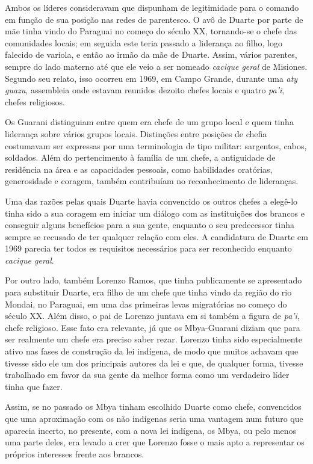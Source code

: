 Ambos os líderes consideravam que dispunham de legitimidade para o
comando em função de sua posição nas redes de parentesco. O avô de
Duarte por parte de mãe tinha vindo do Paraguai no começo do século XX,
tornando-se o chefe das comunidades locais; em seguida este teria
passado a liderança ao filho, logo falecido de varíola, e então ao irmão
da mãe de Duarte. Assim, vários parentes, sempre do lado materno até que
ele veio a ser nomeado \emph{cacique geral} de Misiones. Segundo seu
relato, isso ocorreu em 1969, em Campo Grande, durante uma \emph{aty
guazu}, assembleia onde estavam reunidos dezoito chefes locais e quatro
\emph{pa'i}, chefes religiosos.

Os Guarani distinguiam entre quem era chefe de um grupo local e quem
tinha liderança sobre vários grupos locais. Distinções entre posições de
chefia costumavam ser expressas por uma terminologia de tipo militar:
sargentos, cabos, soldados. Além do pertencimento à família de um chefe,
a antiguidade de residência na área e as capacidades pessoais, como
habilidades oratórias, generosidade e coragem, também contribuíam no
reconhecimento de lideranças.

Uma das razões pelas quais Duarte havia convencido os outros chefes a
elegê-lo tinha sido a sua coragem em iniciar um diálogo com as
instituições dos brancos e conseguir alguns benefícios para a sua gente,
enquanto o seu predecessor tinha sempre se recusado de ter qualquer
relação com eles. A candidatura de Duarte em 1969 parecia ter todos es
requisitos necessários para ser reconhecido enquanto \emph{cacique
geral}.

Por outro lado, também Lorenzo Ramos, que tinha publicamente se
apresentado para substituir Duarte, era filho de um chefe que tinha
vindo da região do rio Mondai, no Paraguai, em uma das primeiras levas
migratórias no começo do século XX. Além disso, o pai de Lorenzo juntava
em si também a figura de \emph{pa'i}, chefe religioso. Esse fato era
relevante, já que os Mbya-Guarani diziam que para ser realmente um chefe
era preciso saber rezar. Lorenzo tinha sido especialmente ativo nas
fases de construção da lei indígena, de modo que muitos achavam que
tivesse sido ele um dos principais autores da lei e que, de qualquer
forma, tivesse trabalhado em favor da sua gente da melhor forma como um
verdadeiro líder tinha que fazer.

Assim, se no passado os Mbya tinham escolhido Duarte como chefe,
convencidos que uma aproximação com os não indígenas seria uma vantagem
num futuro que aparecia incerto, no presente, com a nova lei indígena,
os Mbya, ou pelo menos uma parte deles, era levado a crer que Lorenzo
fosse o mais apto a representar os próprios interesses frente aos
brancos.

